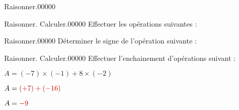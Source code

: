 \documentclass[a4paper,dvipsnames,french,10pt]{book}
\begin{document}
\begin{pageParcoursd}
\begin{ExoCdN}{Raisonner.}{0}{0}{0}{0}{0}
\end{ExoCdN}


\begin{ExoCdN}{Raisonner. Calculer.}{0}{0}{0}{0}{0}
Effectuer les opérations suivantes :\vspace{.2cm}


\end{ExoCdN}

\begin{ExoCdN}{Raisonner.}{0}{0}{0}{0}{0}
Déterminer le signe de l'opération suivante :\vspace{.2cm}

\end{ExoCdN}

\begin{ExoCdN}{Raisonner. Calculer.}{0}{0}{0}{0}{0}
Effectuer l'enchainement d'opérations suivant :

$A=(-7)\times(-1)+8\times(-2)$\vspace{.2cm}

$A=\textcolor{red}{(+7)+(-16)}$\vspace{.2cm}

$A=\textcolor{red}{-9}$
\end{ExoCdN}

\end{pageParcoursd} %
\end{document}
